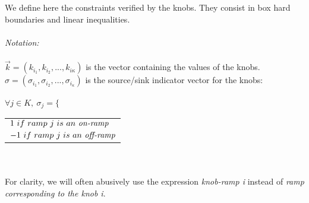 We define here the constraints verified by the knobs. They consist in box hard boundaries and linear inequalities.
\\
\\
\emph{Notation:}\\
\\
$\vec{k}=(k_{i_{1}},k_{i_{2}},...,k_{i{\kappa}})$ is the vector containing the values of the knobs.\\
$\sigma=(\sigma_{i_{1}},\sigma_{i_{2}},...,\sigma_{i_{\kappa}})$ is the source/sink indicator vector for the knobs: \\
\\
$\forall j\in{K}, \ \sigma_{j}=\bigg\{$
\begin{tabular}{l}
	$1\ if\ ramp\ j\ is\ an\ \emph{on-ramp}$ \\
	$-1\ if\ ramp\ j\ is\ an\ \emph{off-ramp}$ \\
\end{tabular}\\
\\
For clarity, we will often abusively use the expression \emph{knob-ramp i} instead of \emph{ramp corresponding to the knob i}.\\